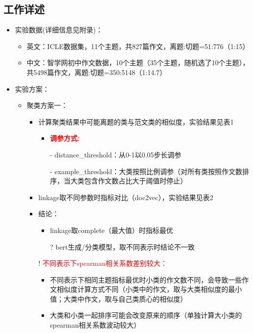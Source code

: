 \documentclass[11pt]{article}
\begin{document}
\begin{CJK}{UTF8}{gkai}
\section{工作详述}
\begin{itemize}
  \item 实验数据(详细信息见附录)：
  \begin{itemize}
    \item 英文：ICLE数据集，11个主题，共827篇作文，离题:切题=51:776（1:15）
    \item 中文：智学网初中作文数据，10个主题（35个主题，随机选了10个主题），共5498篇作文，离题:切题=350:5148（1:14.7）
  \end{itemize}
  \item 实验方案：
  \begin{itemize}
    \item 聚类方案一：
    \begin{itemize}
      \item 计算聚类结果中可能离题的类与范文类的相似度，实验结果见表1
      \begin{itemize}
        \item \textcolor{red}{\textbf{调参方式:}}
        \item [-] distance\_threshold：从0-1以0.05步长调参
        \item [-] example\_threshold：大类按照比例调参（对所有类按照作文数排序，当大类包含作文数占比大于阈值时停止）
      \end{itemize} 
      \item linkage取不同参数时指标对比（doc2vec），实验结果见表2
      \item 结论：
      \begin{itemize}
        \item linkage取complete（最大值）时指标最优
        \item [?] bert生成/分类模型，取不同表示时结论不一致
      \end{itemize}
      \item [!] \textcolor{red}{不同表示下spearman相关系数差别较大：}
      \begin{itemize}
        \item 不同表示下相同主题指标最优时小类的作文数不同，会导致一些作文相似度计算方式不同（小类中的作文，取与大类相似度的最小值；大类中作文，取与自己类质心的相似度）
        \item 大类和小类一起排序可能会改变原来的顺序（单独计算大小类的spearman相关系数波动较大）

\end{itemize}
\end{itemize}
\end{itemize}
\end{itemize}
\end{CJK}
\end{document}

